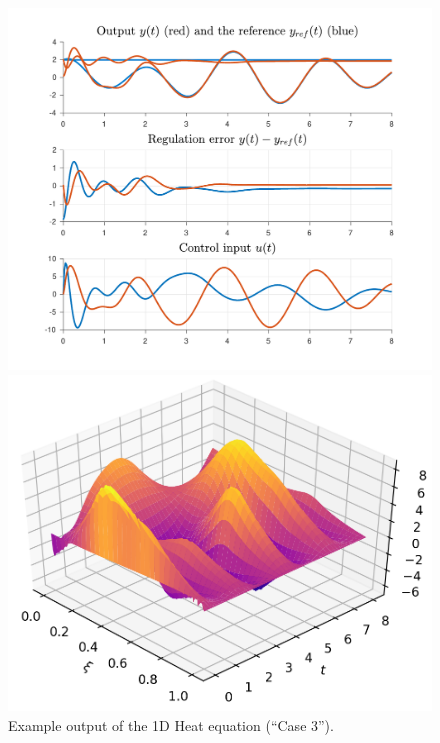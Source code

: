 \documentclass[11pt, a4paper]{amsart}
\theoremstyle{definition}
\numberwithin{equation}{section}
\begin{document}
\begin{figure}[h!]
  \begin{minipage}{0.46\linewidth}
    \includegraphics[width=.95\linewidth]{H1D3outputs.pdf}
  \end{minipage}
  \hfill
  \begin{minipage}{0.52\linewidth}
    \includegraphics[width=\linewidth]{H1d3surf.png}
  \end{minipage}
\caption{Example output of the 1D Heat equation (``Case 3'').}
  \label{fig:1Dheat3}
\end{figure}
\end{document}
